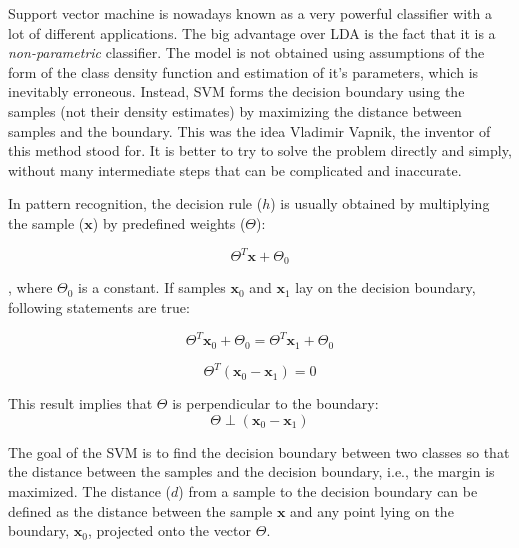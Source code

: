 Support vector machine is nowadays known as a very powerful classifier with a lot of different applications. The big advantage over LDA is the fact that it is a \emph{non-parametric} classifier. The model is not obtained using assumptions of the form of the class density function and estimation of it's parameters, which is inevitably erroneous. Instead, SVM forms the decision boundary using the samples (not their density estimates) by maximizing the distance between samples and the boundary.
This was the idea Vladimir Vapnik, the inventor of this method stood for. It is better to try to solve the problem directly and simply, without many intermediate steps that can be complicated and inaccurate.


In pattern recognition, the decision rule ($h$) is usually obtained by multiplying the sample ($\mathbf{x}$) by predefined weights ($\Theta$):

\begin{equation} 
\Theta^T \mathbf{x} + \Theta_0
\end{equation}

\noindent , where $\Theta_0$ is a constant. If samples $\mathbf{x}_0$ and $\mathbf{x}_1$ lay on the decision boundary, following statements are true:

\begin{equation} 
\Theta^T \mathbf{x}_0 + \Theta_0 = \Theta^T \mathbf{x}_1 + \Theta_0
\end{equation}

\begin{equation} 
\Theta^T (\mathbf{x}_0 - \mathbf{x}_1) = 0
\end{equation}

\noindent This result implies that $\Theta$ is perpendicular to the boundary:
\begin{equation} 
\Theta \perp \left(\mathbf{x}_0 - \mathbf{x}_1\right)
\end{equation}


The goal of the SVM is to find the decision boundary between two classes so that the distance between the samples and the decision boundary, i.e., the margin is maximized. The distance ($d$) from a sample to the decision boundary can be defined as the distance between the sample $\mathbf{x}$ and any point lying on the boundary, $\mathbf{x}_0$, projected onto the vector $\Theta$.

